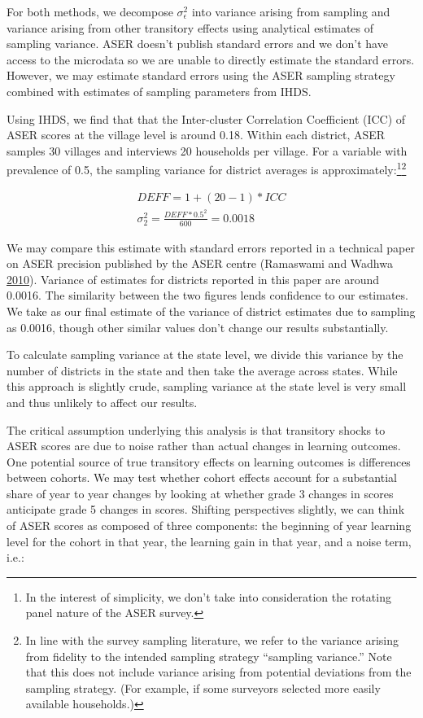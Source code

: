 \documentclass[
  11pt,
]{article}
\begin{document}
For both methods, we decompose \(\sigma^2_{\epsilon}\) into variance arising from sampling and variance arising from other transitory effects using analytical estimates of sampling variance. ASER doesn't publish standard errors and we don't have access to the microdata so we are unable to directly estimate the standard errors. However, we may estimate standard errors using the ASER sampling strategy combined with estimates of sampling parameters from IHDS.

Using IHDS, we find that that the Inter-cluster Correlation Coefficient (ICC) of ASER scores at the village level is around 0.18. Within each district, ASER samples 30 villages and interviews 20 households per village. For a variable with prevalence of 0.5, the sampling variance for district averages is approximately:\footnote{In the interest of simplicity, we don't take into consideration the rotating panel nature of the ASER survey.}\footnote{In line with the survey sampling literature, we refer to the variance arising from fidelity to the intended sampling strategy ``sampling variance.'' Note that this does not include variance arising from potential deviations from the sampling strategy. (For example, if some surveyors selected more easily available households.)}

\[
\begin{aligned}
  DEFF = 1 + (20 - 1)*ICC \\
  \sigma^2_{2} = \frac{DEFF*0.5^2}{600} = 0.0018
\end{aligned}
\]

We may compare this estimate with standard errors reported in a technical paper on ASER precision published by the ASER centre (Ramaswami and Wadhwa \protect\hyperlink{ref-ramaswami2010survey}{2010}). Variance of estimates for districts reported in this paper are around 0.0016. The similarity between the two figures lends confidence to our estimates. We take as our final estimate of the variance of district estimates due to sampling as 0.0016, though other similar values don't change our results substantially.

To calculate sampling variance at the state level, we divide this variance by the number of districts in the state and then take the average across states. While this approach is slightly crude, sampling variance at the state level is very small and thus unlikely to affect our results.

The critical assumption underlying this analysis is that transitory shocks to ASER scores are due to noise rather than actual changes in learning outcomes. One potential source of true transitory effects on learning outcomes is differences between cohorts. We may test whether cohort effects account for a substantial share of year to year changes by looking at whether grade 3 changes in scores anticipate grade 5 changes in scores. Shifting perspectives slightly, we can think of ASER scores as composed of three components: the beginning of year learning level for the cohort in that year, the learning gain in that year, and a noise term, i.e.:
\end{document}
